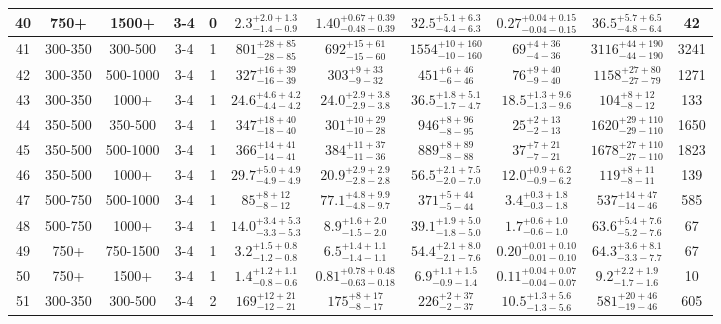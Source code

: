 \documentclass[11pt, oneside]{article}
\begin{document}
\begin{table}
{\begin{tabular}{ |c|c|c|c|c||c|c|c|c||c|c| }
40 & 750+ & 1500+ & 3-4 & 0 & $2.3^{+2.0+1.3}_{-1.4-0.9}$ & $1.40^{+0.67+0.39}_{-0.48-0.39}$ & $32.5^{+5.1+6.3}_{-4.4-6.3}$ & $0.27^{+0.04+0.15}_{-0.04-0.15}$ & $36.5^{+5.7+6.5}_{-4.8-6.4}$ & 42 \\ \hline
41 & 300-350 & 300-500 & 3-4 & 1 & $801^{+28+85}_{-28-85}$ & $692^{+15+61}_{-15-60}$ & $1554^{+10+160}_{-10-160}$ & $69^{+ 4+36}_{- 4-36}$ & $3116^{+44+190}_{-44-190}$ & 3241 \\ \hline
42 & 300-350 & 500-1000 & 3-4 & 1 & $327^{+16+39}_{-16-39}$ & $303^{+ 9+33}_{- 9-32}$ & $451^{+ 6+46}_{- 6-46}$ & $76^{+ 9+40}_{- 9-40}$ & $1158^{+27+80}_{-27-79}$ & 1271 \\ \hline
43 & 300-350 & 1000+ & 3-4 & 1 & $24.6^{+4.6+4.2}_{-4.4-4.2}$ & $24.0^{+2.9+3.8}_{-2.9-3.8}$ & $36.5^{+1.8+5.1}_{-1.7-4.7}$ & $18.5^{+1.3+9.6}_{-1.3-9.6}$ & $104^{+ 8+12}_{- 8-12}$ & 133 \\ \hline
44 & 350-500 & 350-500 & 3-4 & 1 & $347^{+18+40}_{-18-40}$ & $301^{+10+29}_{-10-28}$ & $946^{+ 8+96}_{- 8-95}$ & $25^{+ 2+13}_{- 2-13}$ & $1620^{+29+110}_{-29-110}$ & 1650 \\ \hline
45 & 350-500 & 500-1000 & 3-4 & 1 & $366^{+14+41}_{-14-41}$ & $384^{+11+37}_{-11-36}$ & $889^{+ 8+89}_{- 8-88}$ & $37^{+ 7+21}_{- 7-21}$ & $1678^{+27+110}_{-27-110}$ & 1823 \\ \hline
46 & 350-500 & 1000+ & 3-4 & 1 & $29.7^{+5.0+4.9}_{-4.9-4.9}$ & $20.9^{+2.9+2.9}_{-2.8-2.8}$ & $56.5^{+2.1+7.5}_{-2.0-7.0}$ & $12.0^{+0.9+6.2}_{-0.9-6.2}$ & $119^{+ 8+11}_{- 8-11}$ & 139 \\ \hline
47 & 500-750 & 500-1000 & 3-4 & 1 & $85^{+ 8+12}_{- 8-12}$ & $77.1^{+4.8+9.9}_{-4.8-9.7}$ & $371^{+ 5+44}_{- 5-44}$ & $3.4^{+0.3+1.8}_{-0.3-1.8}$ & $537^{+14+47}_{-14-46}$ & 585 \\ \hline
48 & 500-750 & 1000+ & 3-4 & 1 & $14.0^{+3.4+5.3}_{-3.3-5.3}$ & $8.9^{+1.6+2.0}_{-1.5-2.0}$ & $39.1^{+1.9+5.0}_{-1.8-5.0}$ & $1.7^{+0.6+1.0}_{-0.6-1.0}$ & $63.6^{+5.4+7.6}_{-5.2-7.6}$ & 67 \\ \hline
49 & 750+ & 750-1500 & 3-4 & 1 & $3.2^{+1.5+0.8}_{-1.2-0.8}$ & $6.5^{+1.4+1.1}_{-1.4-1.1}$ & $54.4^{+2.1+8.0}_{-2.1-7.6}$ & $0.20^{+0.01+0.10}_{-0.01-0.10}$ & $64.3^{+3.6+8.1}_{-3.3-7.7}$ & 67 \\ \hline
50 & 750+ & 1500+ & 3-4 & 1 & $1.4^{+1.2+1.1}_{-0.8-0.6}$ & $0.81^{+0.78+0.48}_{-0.63-0.18}$ & $6.9^{+1.1+1.5}_{-0.9-1.4}$ & $0.11^{+0.04+0.07}_{-0.04-0.07}$ & $9.2^{+2.2+1.9}_{-1.7-1.6}$ & 10 \\ \hline
51 & 300-350 & 300-500 & 3-4 & 2 & $169^{+12+21}_{-12-21}$ & $175^{+ 8+17}_{- 8-17}$ & $226^{+ 2+37}_{- 2-37}$ & $10.5^{+1.3+5.6}_{-1.3-5.6}$ & $581^{+20+46}_{-19-46}$ & 605 \\ \hline

\end{tabular}}
\end{table}
\end{document}

